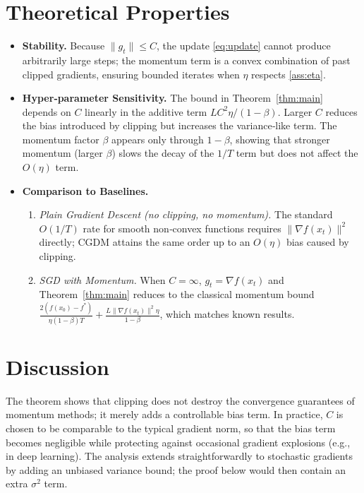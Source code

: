 \documentclass{article}
\begin{document}
\section*{Theoretical Properties}
\begin{itemize}
    \item \textbf{Stability.} Because $\|g_t\|\le C$, the update \eqref{eq:update}
          cannot produce arbitrarily large steps; the momentum term is a
          convex combination of past clipped gradients, ensuring bounded
          iterates when $\eta$ respects \eqref{ass:eta}.
    \item \textbf{Hyper‑parameter Sensitivity.}
          The bound in Theorem~\ref{thm:main} depends on $C$ linearly in the
          additive term $LC^{2}\eta/(1-\beta)$. Larger $C$ reduces the bias
          introduced by clipping but increases the variance‑like term.
          The momentum factor $\beta$ appears only through $1-\beta$, showing
          that stronger momentum (larger $\beta$) slows the decay of the
          $1/T$ term but does not affect the $O(\eta)$ term.
    \item \textbf{Comparison to Baselines.}
          \begin{enumerate}
              \item \emph{Plain Gradient Descent (no clipping, no momentum).}
                    The standard $O(1/T)$ rate for smooth non‑convex functions
                    requires $\|\nabla f(x_t)\|^{2}$ directly; CGDM attains the
                    same order up to an $O(\eta)$ bias caused by clipping.
              \item \emph{SGD with Momentum.}
                    When $C=\infty$, $g_t=\nabla f(x_t)$ and Theorem~\ref{thm:main}
                    reduces to the classical momentum bound
                    $ \frac{2(f(x_0)-f^{*})}{\eta(1-\beta)T}
                      +\frac{L\|\nabla f(x_t)\|^{2}\eta}{1-\beta}$,
                    which matches known results.
          \end{enumerate}
\end{itemize}

\section*{Discussion}
The theorem shows that clipping does not destroy the convergence
guarantees of momentum methods; it merely adds a controllable bias term.
In practice, $C$ is chosen to be comparable to the typical gradient norm,
so that the bias term becomes negligible while protecting against occasional
gradient explosions (e.g., in deep learning). The analysis extends
straightforwardly to stochastic gradients by adding an unbiased variance
bound; the proof below would then contain an extra $\sigma^{2}$ term.
\end{document}
